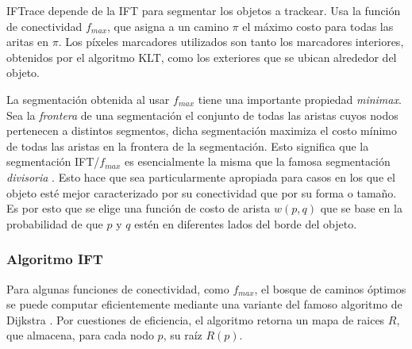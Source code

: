 \documentclass[a4paper,10pt]{article}
\begin{document}
IFTrace depende de la IFT
para segmentar los objetos a trackear. Usa la función de conectividad $f_{max}$, que
asigna a un camino $\pi$ el máximo costo para todas las aritas en $\pi$.
Los píxeles marcadores utilizados son tanto los marcadores interiores, obtenidos
por el algoritmo KLT, como los exteriores que se ubican alrededor del objeto.

La segmentación obtenida al usar $f_{max}$ tiene una importante propiedad
\textit{minimax}. Sea la \textit{frontera} de una segmentación el conjunto de todas las aristas cuyos nodos
pertenecen a distintos segmentos, dicha segmentación maximiza el costo mínimo de todas las aristas en la frontera de la
segmentación. Esto significa que la segmentación IFT/$f_{max}$ es esencialmente
la misma que la famosa segmentación \textit{divisoria} \cite{watershed-segmentation}. Esto
hace que sea particularmente apropiada para casos en los que el objeto esté
mejor caracterizado por su conectividad que por su forma o tamaño. Es por esto que
se elige una función de costo de arista $w(p,q)$ que se base en la probabilidad de
que $p$ y $q$ estén en diferentes lados del borde del objeto.

\subsubsection{Algoritmo IFT}

Para algunas funciones de conectividad, como $f_{max}$, el bosque de caminos
óptimos se puede computar eficientemente mediante una variante del famoso
algoritmo de Dijkstra \cite{watershed-segmentation}. Por cuestiones de
eficiencia, el algoritmo retorna un mapa de raices $R$, que almacena, para
cada nodo $p$, su raíz $R(p)$.\\
\end{document}
